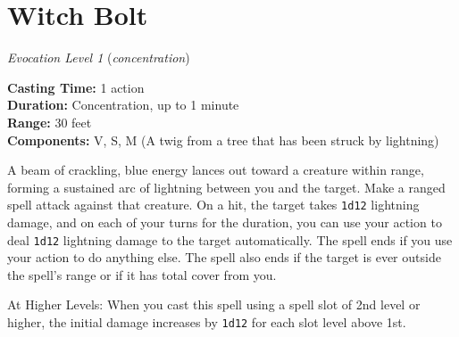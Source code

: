 \documentclass[twocolumn,lettersize]{article}
\begin{document}
  
    {
  

  \section*{Witch Bolt}

    \textit{Evocation Level 1} %
    (\textit{concentration})%
             
  \noindent
  \textbf{Casting Time:} 1 action \\
  \textbf{Duration:} Concentration, up to 1 minute\\
  \textbf{Range:} 30 feet \\
  \textbf{Components:} V, S, M (A twig from a tree that has been struck by lightning) 

  A beam of crackling, blue energy lances out toward a creature within range, 
    forming a sustained arc of lightning between you and the target.
    Make a ranged 
    spell attack against that creature. On a hit, the target takes \texttt{1d12} lightning 
    damage, and on each of your turns for the duration, you can use your action to 
    deal \texttt{1d12} lightning damage to the target automatically. The spell ends if you 
    use your action to do anything else. The spell also ends if the target is ever 
    outside the spell's range or if it has total cover from you.
    
    At Higher Levels: 
    When you cast this spell using a spell slot of 2nd level or higher, the initial 
    damage increases by \texttt{1d12} for each slot level above 1st.
    

  } %
\end{document}
